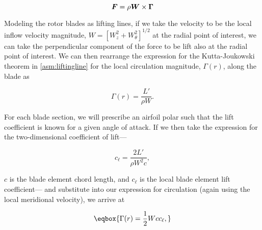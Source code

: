 \smallskip

\begin{assumption}
\label{asm:liftingline}


    \[ \bm{F} = \rho \bm{W} \times \bm{\Gamma} \]



\end{assumption}

Modeling the rotor blades as lifting lines, if we take the velocity to be the local inflow velocity magnitude, \(W=\left[W_z^2+W_\theta^2\right]^{1/2}\) at the radial point of interest, we can take the perpendicular component of the force to be lift also at the radial point of interest.
%
We can then rearrange the expression for the Kutta-Joukowski theorem in \cref{asm:liftingline} for the local circulation magnitude, \(\Gamma(r)\), along the blade as

\begin{equation}
    \Gamma(r) = \frac{L'}{\rho W}.
\end{equation}

\noindent For each blade section, we will prescribe an airfoil polar such that the lift coefficient is known for a given angle of attack.
%
If we then take the expression for the two-dimensional coefficient of lift---

\begin{equation}
    c_\ell = \frac{2 L'}{\rho W^2 c},
\end{equation}

\where \(c\) is the blade element chord length, and \(c_\ell\) is the local blade element lift coefficient--- %
 and substitute into our expression for circulation (again using the local meridional velocity), we arrive at

\begin{equation}
    \label{eqn:bladeelementcirculationrotor}
    \eqbox{
        \Gamma(r) = \frac{1}{2} W c c_\ell,
        }
\end{equation}


